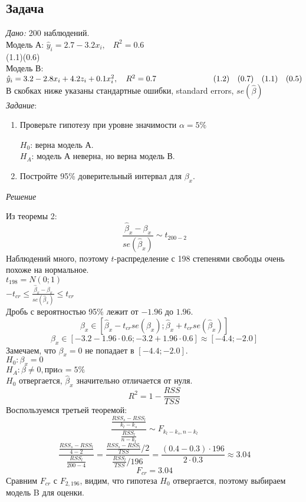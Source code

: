 \documentclass[12pt]{article} %
\theoremstyle{definition} %
\begin{document}
\subsection{Задача}
\textit{Дано:} 200 наблюдений.\\
Модель А: $\hat{y}_i=2.7 - 3.2x_i, \hspace{10pt} R^2=0.6$\\
\indent \hspace{2cm} (1.1)\hspace{10pt}(0.6) \\
Модель В: $\hat{y}_i=3.2 - 2.8x_i + 4.2z_i + 0.1x_i^2, \hspace{10pt} R^2=0.7\\
\indent \hspace{2cm}  (1.2) \hspace{10pt} (0.7) \hspace{10pt} (1.1)  \hspace{10pt}  (0.5)$\\
В скобках ниже указаны стандартные ошибки, standard errors, $se(\hat\beta)$ \\
\indent \textit{Задание}:
\begin{enumerate}
    \item Проверьте гипотезу при уровне значимости $\alpha = 5\% $

$H_0$: верна модель А.\\
$H_A$: модель А неверна, но верна модель В.

\item Постройте 95\% доверительный интервал для $\beta_x.$
\end{enumerate}
\textit{Решение}

Из теоремы 2:
\[ \frac{\hat{\beta}_x-\beta_x}{se(\hat{\beta}_x)}\sim t_{200-2}\]
Наблюдений много, поэтому $t$-распределение с 198 степенями свободы очень похоже на нормальное.\\
$t_{198} = N(0;1)$\\
$-t_{cr} \leq \frac{\hat{\beta}_x-\beta_x}{se(\hat{\beta}_x)} \leq t_{cr} $\\
Дробь с вероятностью 95\% лежит от $-1.96$ до $1.96$.
\[
\beta_x \in [\hat \beta_x  - t_{cr} se(\hat{\beta}_x); \hat \beta_x  + t_{cr} se(\hat{\beta}_x)]
\]
\[
\beta_x \in [-3.2 - 1.96\cdot0.6; -3.2 + 1.96\cdot0.6] \approx [-4.4;-2.0]
\]
Замечаем, что $\beta_x= 0$ не попадает в $[-4.4;-2.0]$.\\
$H_0:\beta_x=0$\\
$H_A:\beta \neq 0, при \alpha=5\%$\\
$H_0$ отвергается, $\hat \beta_x$ значительно отличается от нуля.
\[
R^2=1-\frac{RSS}{TSS}
\]
Воспользуемся третьей теоремой:
\[ \frac{\frac{{RSS}_s-RSS_l}{k_l-k_s}}  {\frac{RSS_l}{n-k_l}} \sim F_{k_l-k_s,n-k_l}
\]
\[
\frac{\frac{{RSS}_s-RSS_l}{4-2}}  {\frac{RSS_l}{200-4}}=\frac{\frac{{RSS}_s-RSS_l}{TSS}/2}  {\frac{RSS_l}{TSS}/196}=
\frac{(0.4-0.3)\cdot196}{2\cdot0.3} \approx 3.04
\]
\[
F_{cr} = 3.04
\]
Сравним $F_{cr}$ с $F_{2,196}$, видим, что гипотеза $H_0$ отвергается, поэтому выбираем модель B для оценки.
\end{document}

